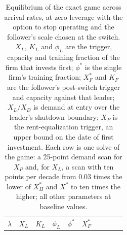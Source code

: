 \documentclass[
  11pt,
  letterpaper,
]{scrartcl}
\begin{document}
\begin{longtable}[]{@{}
  >{\raggedleft\arraybackslash}p{}
  >{\raggedleft\arraybackslash}p{}
  >{\raggedleft\arraybackslash}p{}
  >{\raggedleft\arraybackslash}p{}
  >{\raggedleft\arraybackslash}p{}
  >{\raggedleft\arraybackslash}p{}
  >{\raggedleft\arraybackslash}p{}
  >{\raggedleft\arraybackslash}p{}
  >{\raggedleft\arraybackslash}p{}
  >{\raggedleft\arraybackslash}p{}@{}}
\caption{Equilibrium of the exact game across arrival rates, at zero
leverage with the option to stop operating and the follower's scale
chosen at the switch. \(X_L\), \(K_L\) and \(\phi_L\) are the trigger,
capacity and training fraction of the firm that invests first;
\(\phi^*\) is the single firm's training fraction; \(X_F^*\) and \(K_F\)
are the follower's post-switch trigger and capacity against that leader;
\(X_L/X_D\) is demand at entry over the leader's shutdown boundary;
\(X_P\) is the rent-equalization trigger, an upper bound on the date of
first investment. Each row is one solve of the game: a 25-point demand
scan for \(X_P\) and, for \(X_L\), a scan with ten points per decade
from \(0.03\) times the lower of \(X_H^*\) and \(X^*\) to ten times the
higher; all other parameters at baseline
values.}\label{tbl-duopoly-beliefs}\tabularnewline
\toprule\noalign{}
\begin{minipage}[b]{\linewidth}\raggedleft
\(\lambda\)
\end{minipage} & \begin{minipage}[b]{\linewidth}\raggedleft
\(X_L\)
\end{minipage} & \begin{minipage}[b]{\linewidth}\raggedleft
\(K_L\)
\end{minipage} & \begin{minipage}[b]{\linewidth}\raggedleft
\(\phi_L\)
\end{minipage} & \begin{minipage}[b]{\linewidth}\raggedleft
\(\phi^*\)
\end{minipage} & \begin{minipage}[b]{\linewidth}\raggedleft
\(X_F^*\)
\end{minipage} & \begin{minipage}[b]{\linewidth}\raggedleft

\end{minipage}
\end{longtable}
\end{document}
